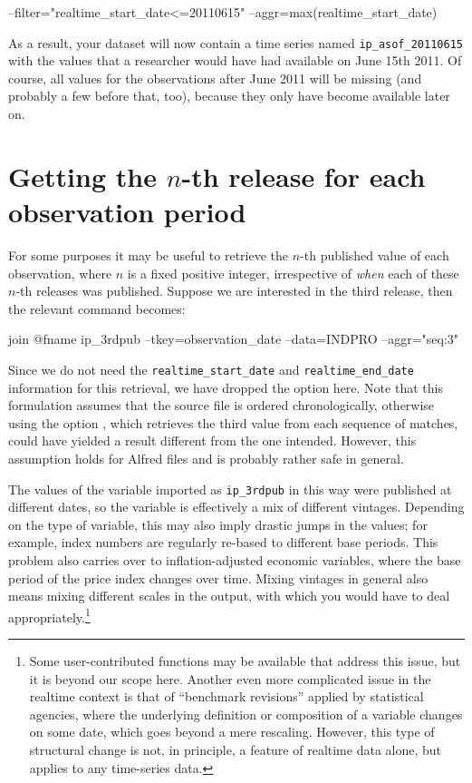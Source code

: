 \begin{code}
  --filter="realtime_start_date<=20110615" --aggr=max(realtime_start_date)
\end{code}
As a result, your dataset will now contain a time series named
\verb|ip_asof_20110615| with the values that a researcher would have
had available on June 15th 2011. Of course, all values for the
observations after June 2011 will be missing (and probably a few
before that, too), because they only have become available later on.

\section{Getting the $n$-th release for each observation period}
\label{sec:realtime-nth}

For some purposes it may be useful to retrieve the $n$-th published
value of each observation, where $n$ is a fixed positive integer,
irrespective of \emph{when} each of these $n$-th releases was
published. Suppose we are interested in the third release, then the
relevant  command becomes:
\begin{code}
  join @fname ip_3rdpub --tkey=observation_date --data=INDPRO --aggr="seq:3"
\end{code}
Since we do not need the \verb|realtime_start_date| and
\verb|realtime_end_date| information for this retrieval, we have
dropped the  option here. Note that this formulation
assumes that the source file is ordered chronologically, otherwise
using the option , which retrieves the third
value from each sequence of matches, could have yielded a result
different from the one intended. However, this assumption holds for
Alfred files and is probably rather safe in general.

The values of the variable imported as \texttt{ip\_3rdpub} in this way
were published at different dates, so the variable is effectively a
mix of different vintages. Depending on the type of variable, this may
also imply drastic jumps in the values; for example, index numbers are
regularly re-based to different base periods. This problem also carries
over to inflation-adjusted economic variables, where the base period
of the price index changes over time. Mixing vintages in general also
means mixing different scales in the output, with which you would have
to deal appropriately.\footnote{Some user-contributed functions may be
  available that address this issue, but it is beyond our scope
  here. Another even more complicated issue in the realtime context is
  that of ``benchmark revisions'' applied by statistical agencies,
  where the underlying definition or composition of a variable changes
  on some date, which goes beyond a mere rescaling. However, this type
  of structural change is not, in principle, a feature of realtime
  data alone, but applies to any time-series data.}


